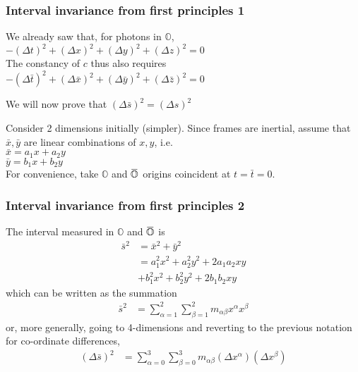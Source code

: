 \documentclass[xcolor=x11names,compress]{beamer}
\renewcommand{\(}{\begin{columns}}
\renewcommand{\)}{\end{columns}}
\newcommand{\<}[1]{\begin{column}{#1}}
\renewcommand{\>}{\end{column}}
\newcommand{\overbar}[1]{\mkern 1.5mu\overline{\mkern-1.5mu#1\mkern-1.5mu}\mkern 1.5mu}
\newcommand{\oframe}{\mathbb{O}}
\newcommand{\obarframe}{\overbar{\mathbb{O}}}
\begin{document}
\begin{frame}
\frametitle{Interval invariance from first principles 1}

We already saw that, for photons in $\oframe$,\\
$-(\Delta t)^2 + (\Delta x)^2 + (\Delta y)^2 + (\Delta z)^2 = 0$\\
The constancy of $c$ thus also requires\\
$-(\Delta \bar{t})^2 + (\Delta \bar{x})^2 + (\Delta \bar{y})^2 
+ (\Delta \bar{z})^2 = 0$
\bigskip

\begin{beamerboxesrounded}[upper=uppercol,lower=lowercol,shadow=true]
{}{We will now prove that $(\Delta \bar{s})^2 = (\Delta s)^2$}
\end{beamerboxesrounded}
\bigskip
Consider 2 dimensions initially (simpler).  Since frames are inertial,
assume that $\bar x, \bar y$ are linear combinations
of $x, y$, i.e.\\
$\bar{x} = a_1x + a_2y$\\
$\bar{y} = b_1x + b_2y$\\
For convenience, take $\oframe$ and $\obarframe$ origins coincident at
$t = \bar{t} = 0$.
\end{frame}

\begin{frame}
\frametitle{Interval invariance from first principles 2}

The interval measured in $\oframe$ and $\obarframe$ is
\begin{align*}
\bar{s}^2 & = \bar{x}^2 + \bar{y}^2 \\
          & = a_1^2 x^2 + a_2^2 y^2 + 2 a_1 a_2 xy \\
          & + b_1^2 x^2 + b_2^2 y^2 + 2 b_1 b_2 xy
\end{align*}
which can be written as the summation
\begin{align*}
\bar{s}^2 & = \sum\limits_{\alpha=1}^2 \sum\limits_{\beta=1}^2 
m_{\alpha\beta} x^{\alpha} x^{\beta}
\end{align*}
or, more generally, going to 4-dimensions and reverting to the previous
notation for co-ordinate differences,
\begin{align}
(\Delta \bar{s})^2 & = \sum\limits_{\alpha=0}^3 \sum\limits_{\beta=0}^3 m_{\alpha\beta}
(\Delta x^{\alpha})(\Delta x^{\beta}) \label{dssum}
\end{align}

\end{frame}
\end{document}
